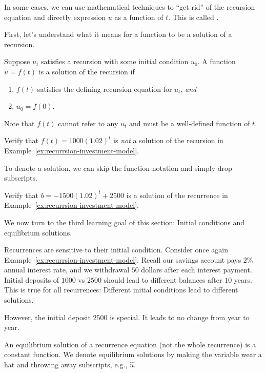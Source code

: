 \documentclass[../main.tex]{subfiles}
\begin{document}
In some cases, we can use mathematical techniques to ``get rid'' of the recursion equation and directly expression \(u\) as a function of \(t\). This is called .

First, let's understand what it means for a function to be a solution of a recursion. 

\begin{definition}
  Suppose \(u_{t}\) satisfies a recursion with some initial condition \(u_{0}\). A function \(u = f(t)\) is a solution of the recursion if 
  \begin{enumerate}
    \item \(f(t)\) satisfies the defining recursion equation for \(u_{t}\), \emph{and}
    \item \(u_{0} = f(0)\).
  \end{enumerate}

  Note that \(f(t)\) cannot refer to any \(u_{t}\) and must be a well-defined function of \(t\).
\end{definition}

\begin{example}
  Verify that \(f(t) = 1000 (1.02)^{t}\) is \emph{not} a solution of the recursion in Example~\ref{ex:recurrsion-investment-model}.
\end{example}
\clearpage

To denote a solution, we can skip the function notation and simply drop subscripts.
\begin{example}
  Verify that \(b = -1500 (1.02)^{t} + 2500\) is a solution of the recurrence in Example~\ref{ex:recurrsion-investment-model}.
\end{example}
\clearpage

We now turn to the third learning goal of this section: Initial conditions and equilibrium solutions. 

Recurrences are sensitive to their initial condition. Consider once again Example~\ref{ex:recurrsion-investment-model}. Recall our savings account pays \(2\%\) annual interest rate, and we withdrawal \(50\) dollars after each interest payment.  Initial deposits of \(1000\) vs \(2500\) should lead to different balances after \(10\) years.  This is true for all recurrences: Different initial conditions lead to different solutions.

However, the initial deposit \(2500\) is special. It leads to no change from year to year.

\begin{definition}
  An equilibrium solution of a recurrence equation (not the whole recurrence) is a constant function.  We denote equilibrium solutions by making the variable wear a hat and throwing away subscripts, e.g., \(\hat{u}\).
\end{definition}
\end{document}
